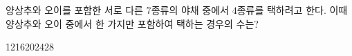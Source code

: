 \hspace*{2mm}\begin{minipage}[t]{\dimexpr\linewidth-2mm\relax}\vspace{0pt}
양상추와 오이를 포함한 서로 다른 $7$종류의 야채 중에서 $4$종류를 택하려고 한다. 이때 양상추와 오이 중에서 한 가지만 포함하여 택하는 경우의 수는?
\begin{choices32}{12}{16}{20}{24}{28}\end{choices32}\end{minipage}
